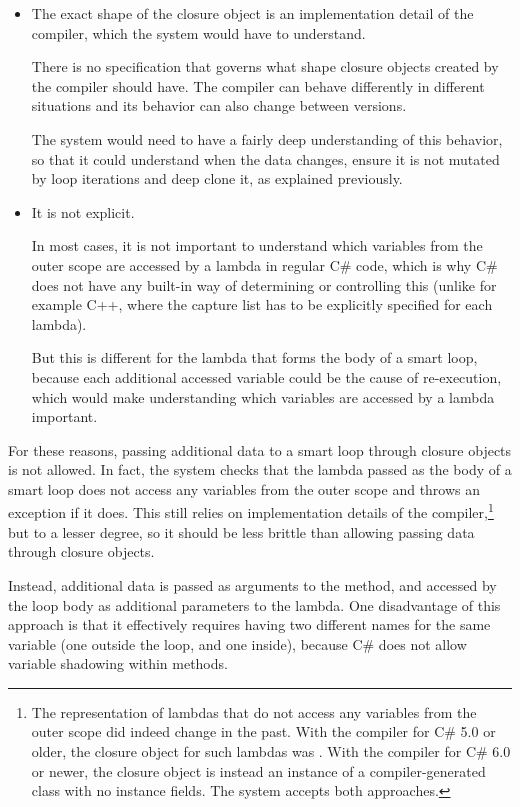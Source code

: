 \begin{itemize}
\begin{itemize}
\item The exact shape of the closure object is an implementation detail of the compiler, which the system would have to understand.

There is no specification that governs what shape closure objects created by the compiler should have. The compiler can behave differently in different situations and its behavior can also change between versions.

The system would need to have a fairly deep understanding of this behavior, so that it could understand when the data changes, ensure it is not mutated by loop iterations and deep clone it, as explained previously.

\item It is not explicit.

In most cases, it is not important to understand which variables from the outer scope are accessed by a lambda in regular C\# code, which is why C\# does not have any built-in way of determining or controlling this (unlike for example C++, where the capture list has to be explicitly specified for each lambda).

But this is different for the lambda that forms the body of a smart loop, because each additional accessed variable could be the cause of re-execution, which would make understanding which variables are accessed by a lambda important.
\end{itemize}

For these reasons, passing additional data to a smart loop through closure objects is not allowed. In fact, the system checks that the lambda passed as the body of a smart loop does not access any variables from the outer scope and throws an exception if it does. This still relies on implementation details of the compiler,\footnote{The representation of lambdas that do not access any variables from the outer scope did indeed change in the past. With the compiler for C\# 5.0 or older, the closure object for such lambdas was . With the compiler for C\# 6.0 or newer, the closure object is instead an instance of a compiler-generated class with no instance fields. \cite{codegen-differences} The system accepts both approaches.} but to a lesser degree, so it should be less brittle than allowing passing data through closure objects.

Instead, additional data is passed as arguments to the  method, and accessed by the loop body as additional parameters to the lambda. One disadvantage of this approach is that it effectively requires having two different names for the same variable (one outside the loop, and one inside), because C\# does not allow variable shadowing within methods.


\end{itemize}
